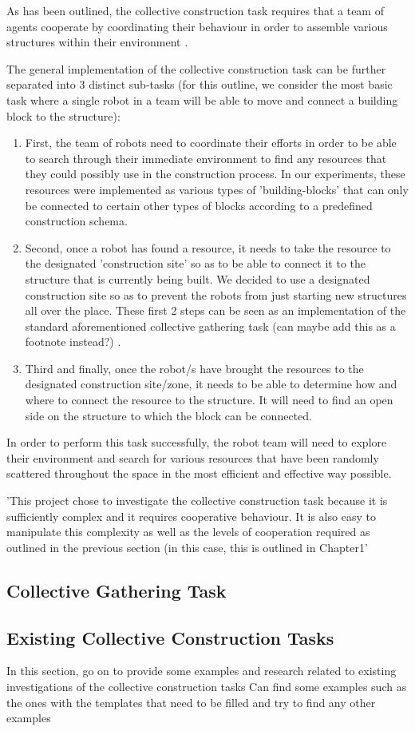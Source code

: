 As has been outlined, the collective construction task requires that a team of agents cooperate by coordinating their behaviour in order to assemble various structures within their environment \cite{NitschkeSaEC2012}.

The general implementation of the collective construction task can be further separated into 3 distinct sub-tasks (for this outline, we consider the most basic task where a single robot in a team will be able to move and connect a building block to the structure):
\begin{enumerate}
	\item First, the team of robots need to coordinate their efforts in order to be able to search through their immediate environment to find any resources that they could possibly use in the construction process. In our experiments, these resources were implemented as various types of 'building-blocks' that can only be connected to certain other types of blocks according to a predefined construction schema.
	\item Second, once a robot has found a resource, it needs to take the resource to the designated 'construction site' so as to be able to connect it to the structure that is currently being built. We decided to use a designated construction site so as to prevent the robots from just starting new structures all over the place. These first 2 steps can be seen as an implementation of the standard aforementioned collective gathering task (can maybe add this as a footnote instead?) \cite{NitschkeSaEC2012}.
	\item Third and finally, once the robot/s have brought the resources to the designated construction site/zone, it needs to be able to determine how and where to connect the resource to the structure. It will need to find an open side on the structure to which the block can be connected.
\end{enumerate}

In order to perform this task successfully, the robot team will need to explore their environment and search for various resources that have been randomly scattered throughout the space in the most efficient and effective way possible.

'This project chose to investigate the collective construction task because it is sufficiently complex and it requires cooperative behaviour. It is also easy to manipulate this complexity as well as the levels of cooperation required as outlined in the previous section (in this case, this is outlined in Chapter1'



\subsection{Collective Gathering Task}

\subsection{Existing Collective Construction Tasks}
In this section, go on to provide some examples and research related to existing investigations of the collective construction tasks
Can find some examples such as the ones with the templates that need to be filled and try to find any other examples
